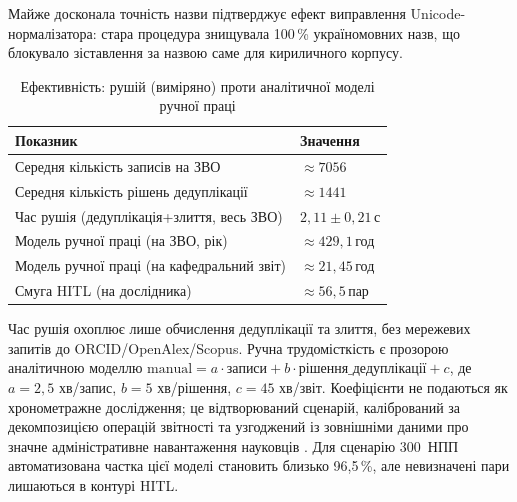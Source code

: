 Майже досконала точність назви підтверджує ефект виправлення Unicode-нормалізатора: стара процедура знищувала 100\,\% україномовних назв, що блокувало зіставлення за назвою саме для кириличного корпусу.

\begin{table}[ht]
\centering
\caption{Ефективність: рушій (виміряно) проти аналітичної моделі ручної праці}
\label{tab:res-eff}
\begin{tabular}{ll}
\toprule
Показник & Значення \\
\midrule
Середня кількість записів на ЗВО & $\approx 7056$ \\
Середня кількість рішень дедуплікації & $\approx 1441$ \\
Час рушія (дедуплікація+злиття, весь ЗВО) & $2{,}11 \pm 0{,}21$\,с \\
Модель ручної праці (на ЗВО, рік) & $\approx 429{,}1$\,год \\
Модель ручної праці (на кафедральний звіт) & $\approx 21{,}45$\,год \\
Смуга HITL (на дослідника) & $\approx 56{,}5$\,пар \\
\bottomrule
\end{tabular}
\end{table}

Час рушія охоплює лише обчислення дедуплікації та злиття, без мережевих запитів до ORCID/OpenAlex/Scopus. Ручна трудомісткість є прозорою аналітичною моделлю $\text{manual}=a\cdot\text{записи}+b\cdot\text{рішення\_дедуплікації}+c$, де $a=2{,}5$ хв/запис, $b=5$ хв/рішення, $c=45$ хв/звіт. Коефіцієнти не подаються як хронометражне дослідження; це відтворюваний сценарій, калібрований за декомпозицією операцій звітності та узгоджений із зовнішніми даними про значне адміністративне навантаження науковців \cite{Rockwell2009FDPBurden}. Для сценарію 300~НПП автоматизована частка цієї моделі становить близько 96,5\,\%, але невизначені пари лишаються в контурі HITL.
